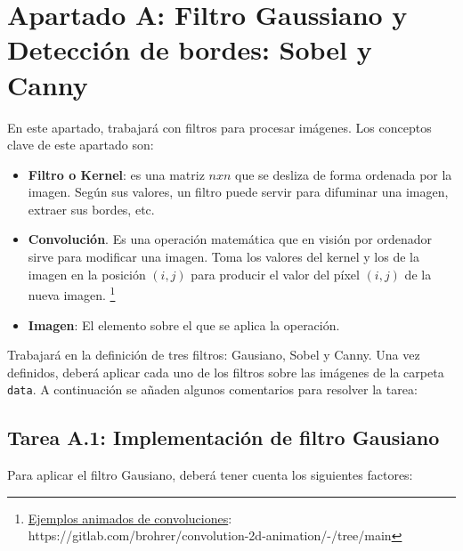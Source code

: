 \chapter{Apartado A: \textbf{Filtro Gaussiano y Detección de bordes: Sobel y Canny}}
\label{chapter:tarea_a}

En este apartado, trabajará con filtros para procesar imágenes. Los conceptos clave de este apartado son:

\begin{itemize}
    \item \textbf{Filtro o Kernel}: es una matriz $n x n$ que se desliza de forma ordenada por la imagen. Según sus valores, un filtro puede servir para difuminar una imagen, extraer sus bordes, etc.
    \item \textbf{Convolución}. Es una operación matemática que en visión por ordenador sirve para modificar una imagen. Toma los valores del kernel y los de la imagen en la posición $(i, j)$ para producir el valor del píxel $(i, j)$ de la nueva imagen. \footnote{\href{https://gitlab.com/brohrer/convolution-2d-animation/-/tree/main}{Ejemplos animados de convoluciones}: https://gitlab.com/brohrer/convolution-2d-animation/-/tree/main}
    \item \textbf{Imagen}: El elemento sobre el que se aplica la operación.
\end{itemize}

Trabajará en la definición de tres filtros: Gausiano, Sobel y Canny. Una vez definidos, deberá aplicar cada uno de los filtros sobre las imágenes de la carpeta \texttt{data}. A continuación se añaden algunos comentarios para resolver la tarea:

\section*{Tarea A.1: Implementación de filtro Gausiano}
{}

Para aplicar el filtro Gausiano, deberá tener cuenta los siguientes factores:

